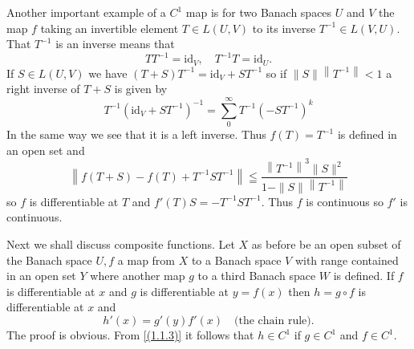 Another important example of a $C^{1}$ map is for two Banach spaces $U$ and $V$ the map $f$ taking an invertible element $T \in L(U, V)$ to its inverse $T^{-1} \in L(V, U)$. That $T^{-1}$ is an inverse means that
\[
	T T^{-1}=\mathrm{id}_{V}, \quad T^{-1} T=\mathrm{id}_{U} .
\]
If $S \in L(U, V)$ we have $(T+S) T^{-1}=\mathrm{id}_{V}+S T^{-1}$ so if $\|S\|\left\|T^{-1}\right\|<1$ a right inverse of $T+S$ is given by
\[
	T^{-1}\left(\mathrm{id}_{V}+S T^{-1}\right)^{-1}=\sum_{0}^{\infty} T^{-1}\left(-S T^{-1}\right)^{k}
\]
In the same way we see that it is a left inverse. Thus $f(T)=T^{-1}$ is defined in an open set and
\[
	\left\|f(T+S)-f(T)+T^{-1} S T^{-1}\right\| \leqq\frac{\left\|T^{-1}\right\|^{3}\|S\|^{2}}{1-\|S\|\left\|T^{-1}\right\|}
\]
so $f$ is differentiable at $T$ and $f'(T) S=-T^{-1} S T^{-1}$. Thus $f$ is continuous so $f'$ is continuous.

Next we shall discuss composite functions. Let $X$ as before be an open subset of the Banach space $U, f$ a map from $X$ to a Banach space $V$ with range contained in an open set $Y$ where another map $g$ to a third Banach space $W$ is defined. If $f$ is differentiable at $x$ and $g$ is differentiable at $y=f(x)$ then $h=g \circ f$ is differentiable at $x$ and
\begin{equation}
    \label{(1.1.3)}
    h'(x)=g'(y) f '(x) \quad\text{(the chain rule).}
\end{equation}
The proof is obvious. From \eqref{(1.1.3)} it follows that $h \in C^{1}$ if $g \in C^{1}$ and $f \in C^{1}$.

